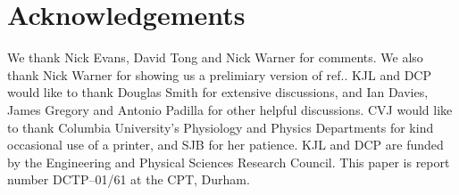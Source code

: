 \documentclass[a4paper,12pt]{article}
\begin{document}
\section*{Acknowledgements} 
We thank Nick Evans, David Tong and Nick Warner for comments. We also
thank Nick Warner for showing us a prelimiary version of
ref.\cite{newwarner}. KJL and DCP would like to thank Douglas Smith
for extensive discussions, and Ian Davies, James Gregory and Antonio
Padilla for other helpful discussions.  CVJ would like to thank Columbia
University's Physiology and Physics Departments for kind occasional
use of a printer, and SJB for her patience.
KJL and DCP are funded by the Engineering and Physical Sciences
Research Council.  This paper is report number DCTP--01/61 at the CPT,
Durham.
\end{document}
